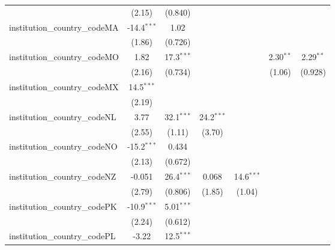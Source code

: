 \begin{tabular}{lcccccc}
                                         & (2.15)        & (0.840)       &               &               &               &   \\   
   institution\_country\_codeMA          & -14.4$^{***}$ & 1.02          &               &               &               &   \\   
                                         & (1.86)        & (0.726)       &               &               &               &   \\   
   institution\_country\_codeMO          & 1.82          & 17.3$^{***}$  &               &               & 2.30$^{**}$   & 2.29$^{**}$\\   
                                         & (2.16)        & (0.734)       &               &               & (1.06)        & (0.928)\\   
   institution\_country\_codeMX          & 14.5$^{***}$  &               &               &               &               &   \\   
                                         & (2.19)        &               &               &               &               &   \\   
   institution\_country\_codeNL          & 3.77          & 32.1$^{***}$  & 24.2$^{***}$  &               &               &   \\   
                                         & (2.55)        & (1.11)        & (3.70)        &               &               &   \\   
   institution\_country\_codeNO          & -15.2$^{***}$ & 0.434         &               &               &               &   \\   
                                         & (2.13)        & (0.672)       &               &               &               &   \\   
   institution\_country\_codeNZ          & -0.051        & 26.4$^{***}$  & 0.068         & 14.6$^{***}$  &               &   \\   
                                         & (2.79)        & (0.806)       & (1.85)        & (1.04)        &               &   \\   
   institution\_country\_codePK          & -10.9$^{***}$ & 5.01$^{***}$  &               &               &               &   \\   
                                         & (2.24)        & (0.612)       &               &               &               &   \\   
   institution\_country\_codePL          & -3.22         & 12.5$^{***}$  &               &               &               &   \\   

\end{tabular}
